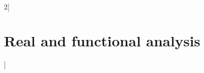 \documentclass[../../../main.tex]{subfiles}
\begin{document}
\renewcommand{\col}{\ana}
\begin{multicols}{2}[\section{Real and functional analysis}]

\end{multicols}
\end{document}
